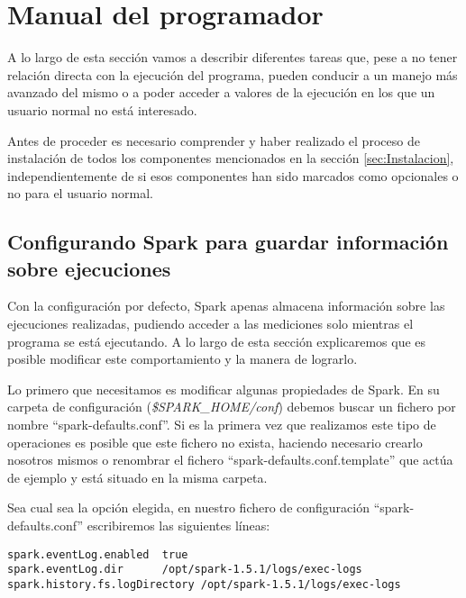 \section{Manual del programador}

A lo largo de esta sección vamos a describir diferentes tareas que, pese a no tener 
relación directa con la ejecución del programa, pueden conducir a un manejo más avanzado del mismo o a poder acceder a valores de la ejecución en los que un usuario normal no está interesado.

Antes de proceder es necesario comprender y haber realizado el proceso de instalación de todos los componentes mencionados en la sección \ref{sec:Instalacion}, independientemente de si esos componentes han sido marcados como opcionales o no para el usuario normal.

\subsection{Configurando Spark para guardar información sobre ejecuciones}\label{subsec:configurandoSpark}

Con la configuración por defecto, Spark apenas almacena información sobre las ejecuciones realizadas, pudiendo acceder a las mediciones solo mientras el programa se está ejecutando. A lo largo de esta sección explicaremos que es posible modificar este comportamiento y la manera de lograrlo.

Lo primero que necesitamos es modificar algunas propiedades de Spark. En su carpeta de configuración  (\textit{\$SPARK\_HOME/conf}) debemos buscar un fichero por nombre ``spark-defaults.conf''. Si es la primera vez que realizamos este tipo de operaciones es posible que este fichero no exista, haciendo necesario crearlo nosotros mismos o renombrar el fichero ``spark-defaults.conf.template'' que actúa de ejemplo y está situado en la misma carpeta.

Sea cual sea la opción elegida, en nuestro fichero de configuración ``spark-defaults.conf'' escribiremos las siguientes líneas:

\begin{lstlisting}[basicstyle=\small]
spark.eventLog.enabled	true
spark.eventLog.dir	    /opt/spark-1.5.1/logs/exec-logs
spark.history.fs.logDirectory /opt/spark-1.5.1/logs/exec-logs
\end{lstlisting}

